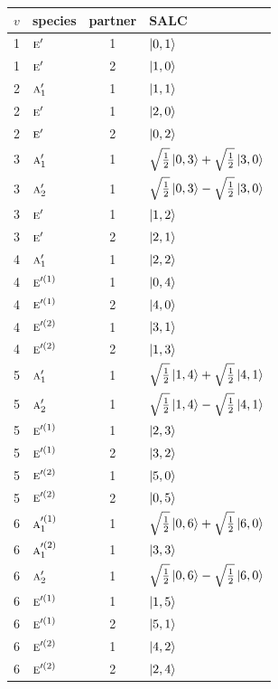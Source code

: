 \documentclass[11pt]{article}
\newcommand{\irr}[1]{\text{\normalfont\scshape #1}}
\begin{document}
\begin{longtable}{c l c p{}}\hline $v$ & species & partner & SALC\\ \hline\endhead
1 & $\irr{e}'$ & 1 & $\ket{0,1}$\\
1 & $\irr{e}'$ & 2 & $\ket{1,0}$\\
\hline
2 & $\irr{a}_{1}'$ & 1 & $\ket{1,1}$\\
2 & $\irr{e}'$ & 1 & $\ket{2,0}$\\
2 & $\irr{e}'$ & 2 & $\ket{0,2}$\\
\hline
3 & $\irr{a}_{1}'$ & 1 & $\sqrt{\tfrac{1}{2}}\ket{0,3}+\sqrt{\tfrac{1}{2}}\ket{3,0}$\\
3 & $\irr{a}_{2}'$ & 1 & $\sqrt{\tfrac{1}{2}}\ket{0,3}-\sqrt{\tfrac{1}{2}}\ket{3,0}$\\
3 & $\irr{e}'$ & 1 & $\ket{1,2}$\\
3 & $\irr{e}'$ & 2 & $\ket{2,1}$\\
\hline
4 & $\irr{a}_{1}'$ & 1 & $\ket{2,2}$\\
4 & $\irr{e}'^{(1)}$ & 1 & $\ket{0,4}$\\
4 & $\irr{e}'^{(1)}$ & 2 & $\ket{4,0}$\\
4 & $\irr{e}'^{(2)}$ & 1 & $\ket{3,1}$\\
4 & $\irr{e}'^{(2)}$ & 2 & $\ket{1,3}$\\
\hline
5 & $\irr{a}_{1}'$ & 1 & $\sqrt{\tfrac{1}{2}}\ket{1,4}+\sqrt{\tfrac{1}{2}}\ket{4,1}$\\
5 & $\irr{a}_{2}'$ & 1 & $\sqrt{\tfrac{1}{2}}\ket{1,4}-\sqrt{\tfrac{1}{2}}\ket{4,1}$\\
5 & $\irr{e}'^{(1)}$ & 1 & $\ket{2,3}$\\
5 & $\irr{e}'^{(1)}$ & 2 & $\ket{3,2}$\\
5 & $\irr{e}'^{(2)}$ & 1 & $\ket{5,0}$\\
5 & $\irr{e}'^{(2)}$ & 2 & $\ket{0,5}$\\
\hline
6 & $\irr{a}_{1}'^{(1)}$ & 1 & $\sqrt{\tfrac{1}{2}}\ket{0,6}+\sqrt{\tfrac{1}{2}}\ket{6,0}$\\
6 & $\irr{a}_{1}'^{(2)}$ & 1 & $\ket{3,3}$\\
6 & $\irr{a}_{2}'$ & 1 & $\sqrt{\tfrac{1}{2}}\ket{0,6}-\sqrt{\tfrac{1}{2}}\ket{6,0}$\\
6 & $\irr{e}'^{(1)}$ & 1 & $\ket{1,5}$\\
6 & $\irr{e}'^{(1)}$ & 2 & $\ket{5,1}$\\
6 & $\irr{e}'^{(2)}$ & 1 & $\ket{4,2}$\\
6 & $\irr{e}'^{(2)}$ & 2 & $\ket{2,4}$\\
\hline
\end{longtable}
\end{document}
